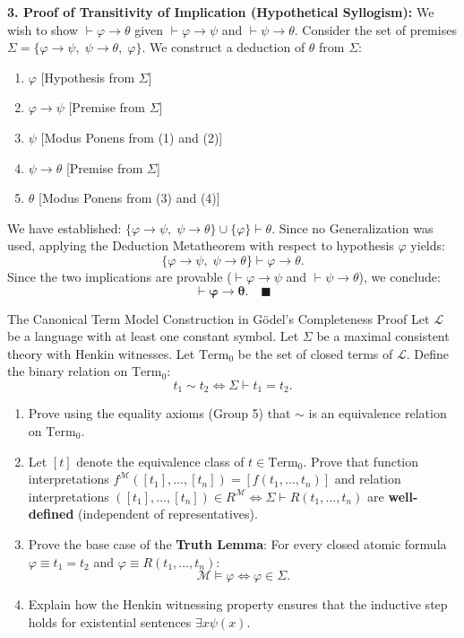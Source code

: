 \begin{solution}
\textbf{3. Proof of Transitivity of Implication (Hypothetical Syllogism):}
We wish to show $\vdash \varphi \to \theta$ given $\vdash \varphi \to \psi$ and $\vdash \psi \to \theta$.
Consider the set of premises $\Sigma = \{\varphi \to \psi, \;\psi \to \theta, \;\varphi\}$.
We construct a deduction of $\theta$ from $\Sigma$:
\begin{enumerate}[leftmargin=1.8em,itemsep=2pt]
  \item[(1)] $\varphi$ \hfill [Hypothesis from $\Sigma$]
  \item[(2)] $\varphi \to \psi$ \hfill [Premise from $\Sigma$]
  \item[(3)] $\psi$ \hfill [Modus Ponens from (1) and (2)]
  \item[(4)] $\psi \to \theta$ \hfill [Premise from $\Sigma$]
  \item[(5)] $\theta$ \hfill [Modus Ponens from (3) and (4)]
\end{enumerate}
We have established: $\{\varphi \to \psi, \;\psi \to \theta\} \cup \{\varphi\} \vdash \theta$.
Since no Generalization was used, applying the Deduction Metatheorem with respect to hypothesis $\varphi$ yields:
\[
\{\varphi \to \psi, \;\psi \to \theta\} \vdash \varphi \to \theta.
\]
Since the two implications are provable ($\vdash \varphi \to \psi$ and $\vdash \psi \to \theta$), we conclude:
\[
\mathbf{\vdash \varphi \to \theta}. \quad \blacksquare
\]
\end{solution}

\begin{exercise}{The Canonical Term Model Construction in G\"odel's Completeness Proof}
Let $\mathcal{L}$ be a language with at least one constant symbol. Let $\Sigma$ be a maximal consistent theory with Henkin witnesses.
Let $\mathrm{Term}_0$ be the set of closed terms of $\mathcal{L}$.
Define the binary relation on $\mathrm{Term}_0$:
\[
t_1 \sim t_2 \iff \Sigma \vdash t_1 = t_2.
\]
\begin{enumerate}[leftmargin=1.5em,itemsep=2pt]
  \item Prove using the equality axioms (Group 5) that $\sim$ is an equivalence relation on $\mathrm{Term}_0$.
  \item Let $[t]$ denote the equivalence class of $t \in \mathrm{Term}_0$.
  Prove that function interpretations $f^\mathcal{M}([t_1], \dots, [t_n]) = [f(t_1, \dots, t_n)]$ and relation interpretations $([t_1], \dots, [t_n]) \in R^\mathcal{M} \iff \Sigma \vdash R(t_1, \dots, t_n)$ are \textbf{well-defined} (independent of representatives).
  \item Prove the base case of the \textbf{Truth Lemma}: For every closed atomic formula $\varphi \equiv t_1 = t_2$ and $\varphi \equiv R(t_1, \dots, t_n)$:
  \[
  \mathcal{M} \models \varphi \iff \varphi \in \Sigma.
  \]
  \item Explain how the Henkin witnessing property ensures that the inductive step holds for existential sentences $\exists x \psi(x)$.
\end{enumerate}
\end{exercise}

